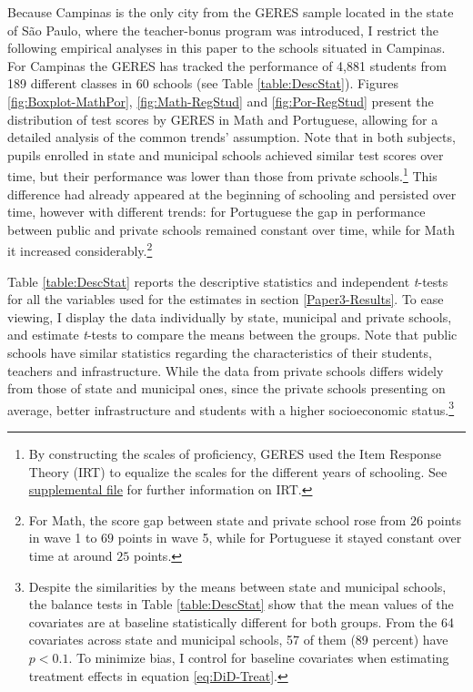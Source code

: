 \documentclass[a4paper, 12pt]{article}
\begin{document}
Because Campinas is the only city from the GERES sample located in the state of São Paulo, where the teacher-bonus program was introduced, I restrict the following empirical analyses in this paper to the schools situated in Campinas. For Campinas the GERES has tracked the performance of 4,881 students from 189 different classes in 60 schools (see Table \ref{table:DescStat}). Figures \ref{fig:Boxplot-MathPor}, \ref{fig:Math-RegStud} and \ref{fig:Por-RegStud} present the distribution of test scores by GERES in Math and Portuguese, allowing for a detailed analysis of the common trends’ assumption. Note that in both subjects, pupils enrolled in state and municipal schools achieved similar test scores over time, but their performance was lower than those from private schools.\footnote{By constructing the scales of proficiency, GERES used the Item Response Theory (IRT) to equalize the scales for the different years of schooling. See \hyperref[SuppMaterial]{supplemental file} for further information on IRT.} This difference had already appeared at the beginning of schooling and persisted over time, however with different trends: for Portuguese the gap in performance between public and private schools remained constant over time, while for Math it increased considerably.\footnote{For Math, the score gap between state and private school rose from $26$ points in wave 1 to $69$ points in wave 5, while for Portuguese it stayed constant over time at around $25$ points.}










Table \ref{table:DescStat} reports the descriptive statistics and independent \textit{t}-tests for all the variables used for the estimates in section \ref{Paper3-Results}. To ease viewing, I display the data individually by state, municipal and private schools, and estimate \textit{t}-tests to compare the means between the groups. Note that public schools have similar statistics regarding the characteristics of their students, teachers and infrastructure. While the data from private schools differs widely from those of state and municipal ones, since the private schools presenting on average, better infrastructure and students with a higher socioeconomic status.\footnote{Despite the similarities by the means between state and municipal schools, the balance tests in Table \ref{table:DescStat} show that the mean values of the covariates are at baseline statistically different for both groups. From the 64 covariates across state and municipal schools, 57 of them (89 percent) have $p < 0.1$. To minimize bias, I control for baseline covariates when estimating treatment effects in equation \eqref{eq:DiD-Treat}.}
\end{document}
